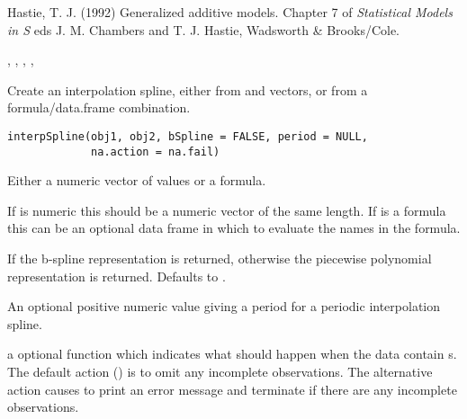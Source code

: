 %
\begin{References}\relax
Hastie, T. J. (1992)
Generalized additive models.
Chapter 7 of \emph{Statistical Models in S}
eds J. M. Chambers and T. J. Hastie, Wadsworth \& Brooks/Cole.
\end{References}
%
\begin{SeeAlso}\relax
{}, , ,
, 
\end{SeeAlso}
%
\begin{Examples}
\end{Examples}
%
\begin{Description}\relax
Create an interpolation spline, either from  and 
vectors, or from a formula/data.frame combination.
\end{Description}
%
\begin{Usage}
\begin{verbatim}
interpSpline(obj1, obj2, bSpline = FALSE, period = NULL,
             na.action = na.fail)
\end{verbatim}
\end{Usage}
%
\begin{Arguments}
\begin{ldescription}
\item[\code{obj1}] Either a numeric vector of  values or a formula.
\item[\code{obj2}] If  is numeric this should be a numeric vector
of the same length.  If  is a formula this can be an
optional data frame in which to evaluate the names in the formula.
\item[\code{bSpline}] If  the b-spline representation is returned,
otherwise the piecewise polynomial representation is returned.
Defaults to .
\item[\code{period}] An optional positive numeric value giving a period for a
periodic interpolation spline.
\item[\code{na.action}] a optional function which indicates what should happen
when the data contain s.  The default action
() is to omit any incomplete observations.  The
alternative action  causes  to print
an error message and terminate if there are any incomplete
observations.
\end{ldescription}
\end{Arguments}
